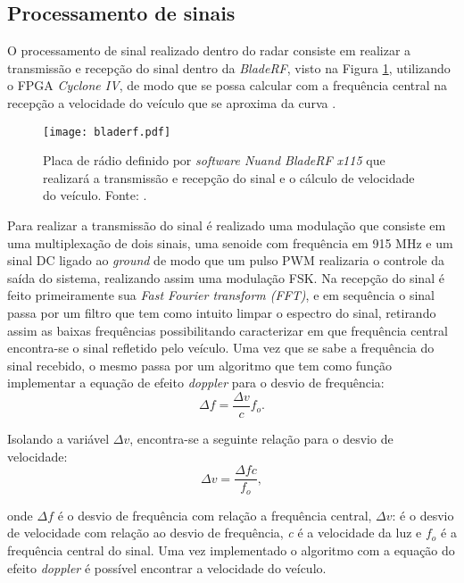 \subsection{Processamento de sinais}
O processamento de sinal realizado dentro do radar consiste em realizar a transmissão e recepção do sinal dentro da \emph{BladeRF}, visto na Figura \ref{bladerf}, utilizando o FPGA \emph{Cyclone IV}, de modo que se possa calcular com a frequência central na recepção a velocidade do veículo que se aproxima da curva \cite{bladerf}. 
\begin{figure}[H]
    \centering
   \texttt{[image: bladerf.pdf]}
   \caption{Placa de rádio definido por \emph{software Nuand BladeRF x115} que realizará a transmissão e recepção do sinal e o cálculo de velocidade do veículo. Fonte: \cite{bladex115}.}
   \label{bladerf}
    \end{figure}
Para realizar a transmissão do sinal é realizado uma modulação que consiste em uma multiplexação de dois sinais, uma senoide com frequência em 915 MHz e um sinal DC ligado ao \emph{ground} de modo que um pulso PWM realizaria o controle da saída do sistema, realizando assim uma modulação FSK.
Na recepção do sinal é feito primeiramente sua \emph{Fast Fourier transform (FFT)}, e em sequência o sinal passa por um filtro que tem como intuito limpar o espectro do sinal, retirando assim as baixas frequências possibilitando caracterizar em que frequência central encontra-se o sinal refletido pelo veículo. Uma vez que se sabe a frequência do sinal recebido, o mesmo passa por um algoritmo que tem como função implementar a equação de efeito \emph{doppler} para o desvio de frequência:
\begin{equation}\label{freq_desv}
  \Delta f = \frac{\Delta v}{c}f_o.
\end{equation}

Isolando a variável $\Delta v$, encontra-se a seguinte relação para o desvio de velocidade:
\begin{equation}\label{vel}
  \Delta v = \frac{\Delta f c}{f_o},
\end{equation}

onde $\Delta f$ é o desvio de frequência com relação a frequência central, $\Delta v$: é o desvio de velocidade com relação ao desvio de frequência, \emph{c} é a velocidade da luz e $f_o$ é a frequência central do sinal. Uma vez implementado o algoritmo com a equação do efeito \emph{doppler} é possível encontrar a velocidade do veículo.
